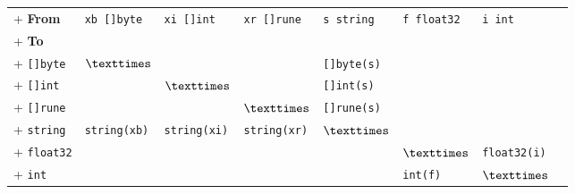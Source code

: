 \begin{tabular}{llllllll}
+    \textbf{From}       &  \verb|xb []byte|& \verb|xi []int| & \verb|xr []rune| & \verb|s string|     & \verb|f float32|       &  \verb|i int| \\ \cmidrule(r){1-7}
+      \textbf{To}       &                  &                 &   &                        &                    & \\ \cmidrule(r){1-1}
+  \verb|[]byte|    & $\texttimes$          &                 &   & \verb|[]byte(s)|       &                    & \\
+  \verb|[]int|     &               & $\texttimes$            &   & \verb|[]int(s)|        &                    & \\
+  \verb|[]rune|    &                &                         & $\texttimes$  &  \verb|[]rune(s)| &                    & \\
+  \verb|string|    &\verb|string(xb)| &\verb|string(xi)|      &  \verb|string(xr)| &   $\texttimes$       &                    & \\
+ \verb|float32|         &                  &                         &   &                        & $\texttimes$       & \verb|float32(i)|\\
+     \verb|int|         &                  &                         &   &                        & \verb|int(f)|      & $\texttimes$ \\
\end{tabular}
